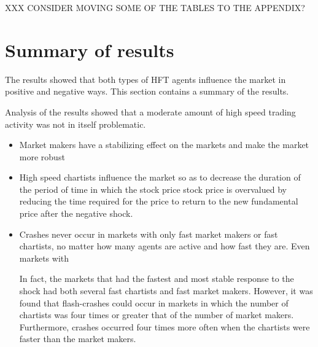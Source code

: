 \begin{comment}
 Outliers  &        53.1 &        1107 &    15.0 &                      3790.6 &          15.5 &          4.5 &        50.7 &            15.9 &            8.3 & 23454 \\
 \bottomrule
 \end{tabular}
  \label{table:d11_gmm_std}
  \caption{Cluster standard deviations (\deleven)}
  \end{table}
 \end{comment}


 

XXX CONSIDER MOVING SOME OF THE TABLES TO THE APPENDIX?

\section{Summary of results}
The results showed that both types of HFT agents influence the market in positive and negative ways. This section contains a summary of the results.


 Analysis of the results showed that a moderate amount of high speed trading activity was not in itself problematic.
\begin{itemize}
\item Market makers have a stabilizing effect on the markets and make the market more robust

\item High speed chartists influence the market so as to decrease the duration of the period of time in which the stock price stock price is overvalued by reducing the time required for the price to return to the new fundamental price after the negative shock. 
\item Crashes never occur in markets with only fast market makers or fast chartists, no matter how many agents are active and how fast they are. Even markets with 

In fact, the markets that had the fastest and most stable response to the shock had both several fast chartists and fast market makers. However, it was found that flash-crashes could occur in markets in which  the number of chartists was four times or greater that of the number of market makers. Furthermore, crashes occurred four times more often when the chartists were faster than the market makers.





\end{itemize}





